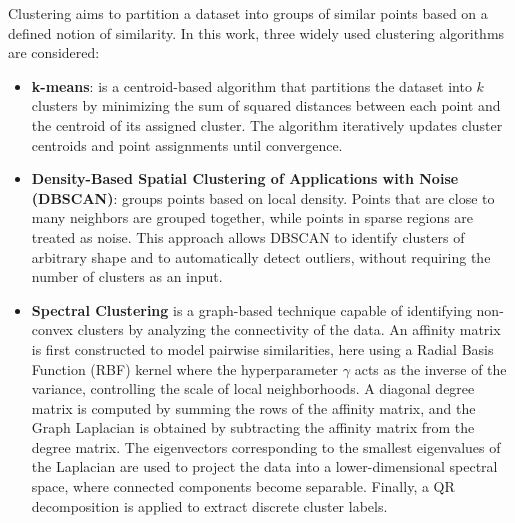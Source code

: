 \documentclass[prl,twocolumn]{revtex4-1}
\begin{document}
Clustering aims to partition a dataset into groups of similar points based on a defined notion of similarity.
In this work, three widely used clustering algorithms are considered:
\begin{itemize}
    \item \textbf{k-means}:
    is a centroid-based algorithm that partitions the dataset into $k$ clusters by minimizing the sum of squared distances between each point and the centroid of its assigned cluster.
    The algorithm iteratively updates cluster centroids and point assignments until convergence.

    \item \textbf{Density-Based Spatial Clustering of Applications with Noise (DBSCAN)}:
    groups points based on local density.
    Points that are close to many neighbors are grouped together, while points in sparse regions are treated as noise.
    This approach allows DBSCAN to identify clusters of arbitrary shape and to automatically detect outliers, without requiring the number of clusters as an input.

    \item \textbf{Spectral Clustering}
    is a graph-based technique capable of identifying non-convex clusters by analyzing the connectivity of the data.
    An affinity matrix is first constructed to model pairwise similarities, here using a Radial Basis Function (RBF) kernel where the hyperparameter $\gamma$ acts as the inverse of the variance, controlling the scale of local neighborhoods.
    A diagonal degree matrix is computed by summing the rows of the affinity matrix, and the Graph Laplacian is obtained by subtracting the affinity matrix from the degree matrix.
    The eigenvectors corresponding to the smallest eigenvalues of the Laplacian are used to project the data into a lower-dimensional spectral space, where connected components become separable.
    Finally, a QR decomposition is applied to extract discrete cluster labels.
    
\end{itemize}
\end{document}
